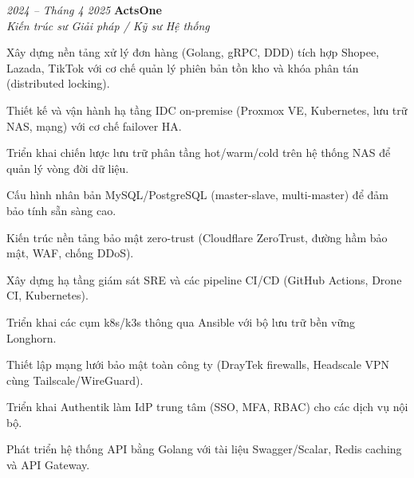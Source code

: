 \begin{twocolentry}{\textit{2024 -- Tháng 4 2025}}
    \textbf{ActsOne} \\[4pt]
    \textit{Kiến trúc sư Giải pháp / Kỹ sư Hệ thống}
\end{twocolentry}
\begin{onecolentry}
    \begin{highlights}
        \item Xây dựng nền tảng xử lý đơn hàng (Golang, gRPC, DDD) tích hợp Shopee, Lazada, TikTok với cơ chế quản lý phiên bản tồn kho và khóa phân tán (distributed locking).
        \item Thiết kế và vận hành hạ tầng IDC on-premise (Proxmox VE, Kubernetes, lưu trữ NAS, mạng) với cơ chế failover HA.
        \item Triển khai chiến lược lưu trữ phân tầng hot/warm/cold trên hệ thống NAS để quản lý vòng đời dữ liệu.
        \item Cấu hình nhân bản MySQL/PostgreSQL (master-slave, multi-master) để đảm bảo tính sẵn sàng cao.
        \item Kiến trúc nền tảng bảo mật zero-trust (Cloudflare ZeroTrust, đường hầm bảo mật, WAF, chống DDoS).
        \item Xây dựng hạ tầng giám sát SRE và các pipeline CI/CD (GitHub Actions, Drone CI, Kubernetes).
        \item Triển khai các cụm k8s/k3s thông qua Ansible với bộ lưu trữ bền vững Longhorn.
        \item Thiết lập mạng lưới bảo mật toàn công ty (DrayTek firewalls, Headscale VPN cùng Tailscale/WireGuard).
        \item Triển khai Authentik làm IdP trung tâm (SSO, MFA, RBAC) cho các dịch vụ nội bộ.
        \item Phát triển hệ thống API bằng Golang với tài liệu Swagger/Scalar, Redis caching và API Gateway.
    \end{highlights}
\end{onecolentry}
\vspace{0.2 cm}

